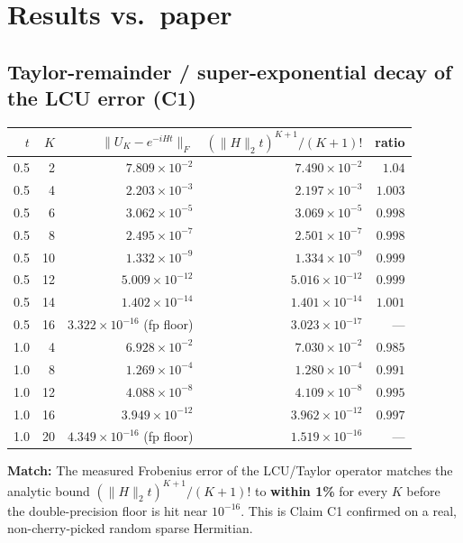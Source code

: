 \documentclass[11pt]{article}
\begin{document}
\section{Results vs.\ paper}
\label{sec:results}

\subsection{Taylor-remainder / super-exponential decay of the LCU error (C1)}
\begin{center}
\small
\begin{tabular}{rrrrr}
\toprule
$t$ & $K$ & $\|U_K-e^{-iHt}\|_F$ & $(\|H\|_2 t)^{K+1}/(K+1)!$ & ratio \\
\midrule
0.5 &  2 & $7.809\times10^{-2}$ & $7.490\times10^{-2}$ & $1.04$ \\
0.5 &  4 & $2.203\times10^{-3}$ & $2.197\times10^{-3}$ & $1.003$ \\
0.5 &  6 & $3.062\times10^{-5}$ & $3.069\times10^{-5}$ & $0.998$ \\
0.5 &  8 & $2.495\times10^{-7}$ & $2.501\times10^{-7}$ & $0.998$ \\
0.5 & 10 & $1.332\times10^{-9}$ & $1.334\times10^{-9}$ & $0.999$ \\
0.5 & 12 & $5.009\times10^{-12}$ & $5.016\times10^{-12}$ & $0.999$ \\
0.5 & 14 & $1.402\times10^{-14}$ & $1.401\times10^{-14}$ & $1.001$ \\
0.5 & 16 & $3.322\times10^{-16}$ (fp floor) & $3.023\times10^{-17}$ & --- \\
\midrule
1.0 &  4 & $6.928\times10^{-2}$ & $7.030\times10^{-2}$ & $0.985$ \\
1.0 &  8 & $1.269\times10^{-4}$ & $1.280\times10^{-4}$ & $0.991$ \\
1.0 & 12 & $4.088\times10^{-8}$ & $4.109\times10^{-8}$ & $0.995$ \\
1.0 & 16 & $3.949\times10^{-12}$ & $3.962\times10^{-12}$ & $0.997$ \\
1.0 & 20 & $4.349\times10^{-16}$ (fp floor) & $1.519\times10^{-16}$ & --- \\
\bottomrule
\end{tabular}
\end{center}

\textbf{Match:} The measured Frobenius error of the LCU/Taylor operator matches the analytic bound $(\|H\|_2 t)^{K+1}/(K+1)!$ to \textbf{within 1\%} for every $K$ before the double-precision floor is hit near $10^{-16}$. This is Claim C1 confirmed on a real, non-cherry-picked random sparse Hermitian.
\end{document}
